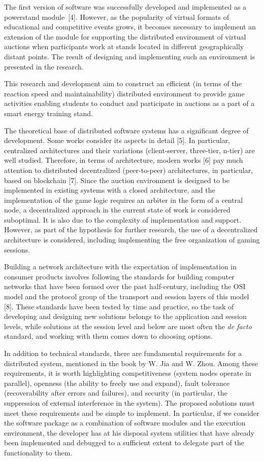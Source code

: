 \documentclass[
]{ceurart}
\begin{document}
The first version of software was successfully developed and implemented as a powerstand module~[4]. However, as the popularity of virtual formats of educational and competitive events grows, it becomes necessary to implement an extension of the module for supporting the distributed environment of virtual auctions when participants work at stands located in different geographically distant points. The result of designing and implementing such an environment is presented in the research.

This research and development aim to construct an efficient (in terms of the reaction speed and maintainability) distributed environment to provide game activities enabling students to conduct and participate in auctions as a part of a smart energy training stand.

The theoretical base of distributed software systems has a significant degree of development. Some works consider its aspects in detail [5]. In particular, centralized architectures and their variations (client-server, three-tier, n-tier) are well studied. Therefore, in terms of architecture, modern works [6] pay much attention to distributed decentralized (peer-to-peer) architectures, in particular, based on blockchain [7]. Since the auction environment is designed to be implemented in existing systems with a closed architecture, and the implementation of the game logic requires an arbiter in the form of a central node, a decentralized approach in the current state of work is considered suboptimal. It is also due to the complexity of implementation and support. However, as part of the hypothesis for further research, the use of a decentralized architecture is considered, including implementing the free organization of gaming sessions.

Building a network architecture with the expectation of implementation in consumer products involves following the standards for building computer networks that have been formed over the past half-century, including the OSI model and the protocol group of the transport and session layers of this model [8]. These standards have been tested by time and practice, so the task of developing and designing new solutions belongs to the application and session levels, while solutions at the session level and below are most often the \emph{de facto} standard, and working with them comes down to choosing options.

In addition to technical standards, there are fundamental requirements for a distributed system, mentioned in the book by W. Jia and W. Zhou. Among these requirements, it is worth highlighting competitiveness (system nodes operate in parallel), openness (the ability to freely use and expand), fault tolerance (recoverability after errors and failures), and security (in particular, the suppression of external interference in the system). The proposed solutions must meet these requirements and be simple to implement. In particular, if we consider the software package as a combination of software modules and the execution environment, the developer has at his disposal system utilities that have already been implemented and debugged to a sufficient extent to delegate part of the functionality to them.
\end{document}
